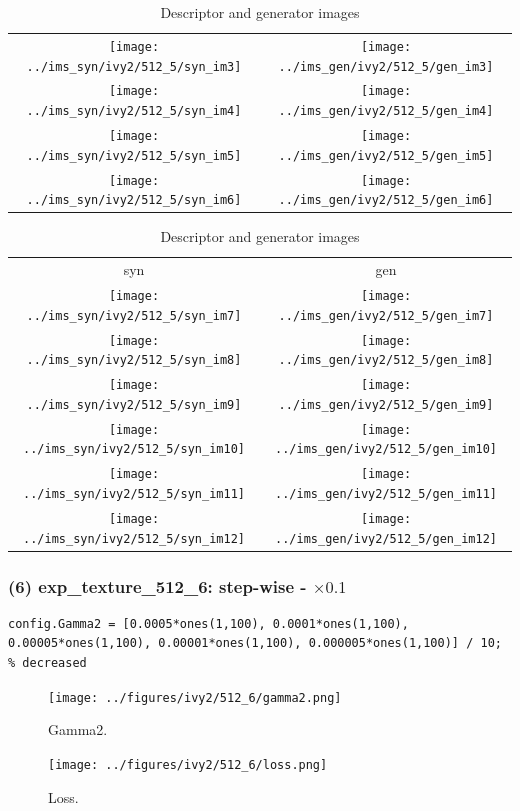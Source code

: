 \documentclass[letter]{article}
\begin{document}
\begin{table}[h!]
\begin{tabular}{cc}
		\texttt{[image: ../ims\_syn/ivy2/512\_5/syn\_im3]} & \texttt{[image: ../ims\_gen/ivy2/512\_5/gen\_im3]} \tabularnewline
		\texttt{[image: ../ims\_syn/ivy2/512\_5/syn\_im4]} & \texttt{[image: ../ims\_gen/ivy2/512\_5/gen\_im4]} \tabularnewline
		\texttt{[image: ../ims\_syn/ivy2/512\_5/syn\_im5]} & \texttt{[image: ../ims\_gen/ivy2/512\_5/gen\_im5]} \tabularnewline
		\texttt{[image: ../ims\_syn/ivy2/512\_5/syn\_im6]} & \texttt{[image: ../ims\_gen/ivy2/512\_5/gen\_im6]} \tabularnewline
	\end{tabular}
	\begin{tabular}{cc}
		syn & gen\tabularnewline
		\texttt{[image: ../ims\_syn/ivy2/512\_5/syn\_im7]} & \texttt{[image: ../ims\_gen/ivy2/512\_5/gen\_im7]} \tabularnewline
		\texttt{[image: ../ims\_syn/ivy2/512\_5/syn\_im8]} & \texttt{[image: ../ims\_gen/ivy2/512\_5/gen\_im8]} \tabularnewline
		\texttt{[image: ../ims\_syn/ivy2/512\_5/syn\_im9]} & \texttt{[image: ../ims\_gen/ivy2/512\_5/gen\_im9]} \tabularnewline
		\texttt{[image: ../ims\_syn/ivy2/512\_5/syn\_im10]} & \texttt{[image: ../ims\_gen/ivy2/512\_5/gen\_im10]} \tabularnewline
		\texttt{[image: ../ims\_syn/ivy2/512\_5/syn\_im11]} & \texttt{[image: ../ims\_gen/ivy2/512\_5/gen\_im11]} \tabularnewline
		\texttt{[image: ../ims\_syn/ivy2/512\_5/syn\_im12]} & \texttt{[image: ../ims\_gen/ivy2/512\_5/gen\_im12]} \tabularnewline
	\end{tabular}
	\caption{Descriptor and generator images}
\end{table}
\newpage

\subsubsection*{(6) exp\_texture\_512\_6: step-wise - $\times0.1$}

\begin{lstlisting}
config.Gamma2 = [0.0005*ones(1,100), 0.0001*ones(1,100), 0.00005*ones(1,100), 0.00001*ones(1,100), 0.000005*ones(1,100)] / 10; % decreased 
\end{lstlisting}

\begin{figure}[h!]
	\centering
	\texttt{[image: ../figures/ivy2/512\_6/gamma2.png]}
	\caption{\label{fig:gamma1}Gamma2.}
\end{figure}

\begin{figure}[h!]
	\centering
	\texttt{[image: ../figures/ivy2/512\_6/loss.png]}
	\caption{\label{fig:gamma1}Loss.}
\end{figure}
\end{document}
